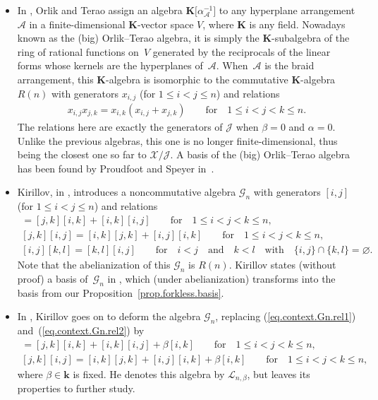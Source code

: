 \documentclass[pdftex]{sigma}
\numberwithin{equation}{section}
\begin{document}
\begin{itemize}
Again, this generalizes to an arbitrary hyperplane arrangement, yielding what is called its Artinian Orlik--Terao algebra (the algebra $W(
\mathcal{A}) $ in~\cite{OrlTer94}).

\item In \cite{OrlTer94}, Orlik and Terao assign an algebra $\mathbf{K} \big[\alpha_{\mathcal{A}}^{-1}\big] $ to any hyperplane arrangement
$\mathcal{A}$ in a finite-dimensional $\mathbf{K}$-vector space $V$, where $\mathbf{K}$ is any field. Nowadays known as the (big) Orlik--Terao algebra, it is simply the $\mathbf{K}$-subalgebra of the ring of rational functions on~$V$ generated by the reciprocals of the linear forms whose kernels are the hyperplanes of~$\mathcal{A}$. When~$\mathcal{A}$ is the braid arrangement, this $\mathbf{K}$-algebra is isomorphic to the commutative $\mathbf{K}$-algebra $R(n) $ with generators $x_{i,j}$ (for $1\leq i<j\leq n$) and relations
\begin{gather*}
x_{i,j}x_{j,k}=x_{i,k} ( x_{i,j}+x_{j,k} ) \qquad \text{for} \quad 1\leq i<j<k\leq n.
\end{gather*}
The relations here are exactly the generators of $\mathcal{J}$ when $\beta=0$ and $\alpha=0$. Unlike the previous algebras, this one is no longer finite-dimensional, thus being the closest one so far to $\mathcal{X}/\mathcal{J}$. A basis of the (big) Orlik--Terao algebra has been found by Proudfoot and Speyer in~\cite{ProSpe06}.

\item Kirillov, in \cite[Section~4]{Kirill97}, introduces a noncommutative algebra $\mathcal{G}_{n}$ with generators $[i,j] $ (for $1\leq i<j\leq n$) and relations%
\begin{gather}
[i,j] [j,k] =[j,k] [i,k] +[i,k] [i,j]\qquad \text{for} \quad 1\leq i<j<k\leq n,\label{eq.context.Gn.rel1}\\
[j,k] [i,j] =[i,k] [j,k] +[i,j] [i,k] \qquad \text{for} \quad 1\leq i<j<k\leq n,\label{eq.context.Gn.rel2}\\
[i,j][k,l] = [ k,l] [i,j] \qquad \text{for} \quad i<j \quad \text{and} \quad k<l \quad \text{with} \quad \{i,j\}
\cap \{ k,l \} =\varnothing .\nonumber
\end{gather}
Note that the abelianization of this $\mathcal{G}_{n}$ is $R(n)$. Kirillov states (without proof) a basis of~$\mathcal{G}_{n}$ in
\cite[Theorem~4.3]{Kirill97}, which (under abelianization) transforms into the basis from our Proposition~\ref{prop.forkless.basis}.

\item In \cite[Definition 10.5]{Kirill97}, Kirillov goes on to deform the algebra $\mathcal{G}_{n}$, replacing (\ref{eq.context.Gn.rel1}) and~(\ref{eq.context.Gn.rel2}) by
\begin{gather*}
[i,j] [j,k] =[j,k] [i,k] +[i,k] [i,j] +\beta[i,k] \qquad \text{for} \quad 1\leq i<j<k\leq n,\\
[j,k] [i,j] =[i,k] [j,k] +[i,j] [i,k] +\beta[i,k] \qquad \text{for} \quad 1\leq i<j<k\leq n,
\end{gather*}
where $\beta\in\mathbf{k}$ is fixed. He denotes this algebra by $\mathcal{L}_{n,\beta}$, but leaves its properties to further study.


\end{itemize}
\end{document}
